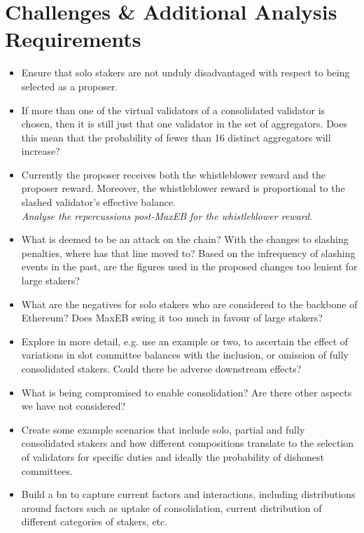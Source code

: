 \documentclass[UTF8]{article}
\begin{document}
\section{Challenges \& Additional Analysis Requirements}
\begin{itemize}
\item Ensure that solo stakers are not unduly disadvantaged with respect to being selected as a proposer.
\item If more than one of the virtual validators of a consolidated validator is chosen, then it is still just that one validator in the set of aggregators. Does this mean that  the probability of fewer than 16 distinct aggregators will increase?
\item Currently the proposer receives both the whistleblower reward and the proposer reward. Moreover, the whistleblower reward is proportional to the slashed validator's effective balance. \\
\textit{Analyse the repercussions post-MaxEB for the whistleblower reward}.
\item What is deemed to be an attack on the chain? With the changes to slashing penalties, where has that line moved to? Based on the infrequency of slashing events in the past, are the figures used in the proposed changes too lenient for large stakers?
\item What are the negatives for solo stakers who are considered to the backbone of Ethereum? Does MaxEB swing it too much in favour of large stakers?
\item Explore in more detail, e.g. use an example or two, to ascertain the effect of variations in slot committee balances with the inclusion, or omission of fully consolidated stakers. Could there be adverse downstream effects?
\item What is being compromised to enable consolidation? Are there other aspects we have not considered?
\item Create some example scenarios that include solo, partial and fully consolidated stakers and how different compositions translate to the selection of validators for specific duties and ideally the probability of dishonest committees.
\item Build a \gls{bn} to capture current factors and interactions, including distributions around factors such as uptake of consolidation, current distribution of different categories of stakers, etc.
\end{itemize}
\end{document}
